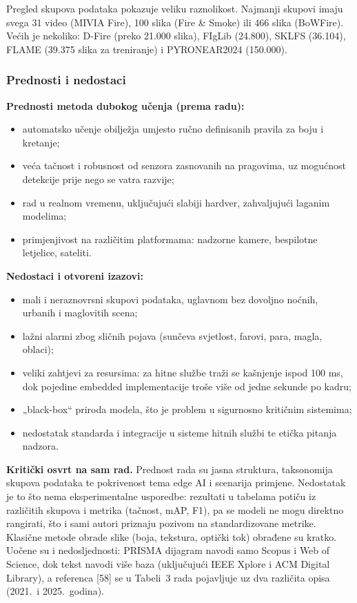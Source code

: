Pregled skupova podataka pokazuje veliku raznolikost. Najmanji skupovi imaju svega 31 video (MIVIA Fire), 100 slika (Fire \& Smoke) ili 466 slika (BoWFire). Većih je nekoliko: D-Fire (preko 21.000 slika), FIgLib (24.800), SKLFS (36.104), FLAME (39.375 slika za treniranje) i PYRONEAR2024 (150.000).

\subsubsection{Prednosti i nedostaci}
\textbf{Prednosti metoda dubokog učenja (prema radu):}
\begin{itemize}
  \item automatsko učenje obilježja umjesto ručno definisanih pravila za boju i kretanje;
  \item veća tačnost i robusnost od senzora zasnovanih na pragovima, uz mogućnost detekcije prije nego se vatra razvije;
  \item rad u realnom vremenu, uključujući slabiji hardver, zahvaljujući laganim modelima;
  \item primjenjivost na različitim platformama: nadzorne kamere, bespilotne letjelice, sateliti.
\end{itemize}

\textbf{Nedostaci i otvoreni izazovi:}
\begin{itemize}
  \item mali i neraznovrsni skupovi podataka, uglavnom bez dovoljno noćnih, urbanih i maglovitih scena;
  \item lažni alarmi zbog sličnih pojava (sunčeva svjetlost, farovi, para, magla, oblaci);
  \item veliki zahtjevi za resursima: za hitne službe traži se kašnjenje ispod 100 ms, dok pojedine embedded implementacije troše više od jedne sekunde po kadru;
  \item „black-box“ priroda modela, što je problem u sigurnosno kritičnim sistemima;
  \item nedostatak standarda i integracije u sisteme hitnih službi te etička pitanja nadzora.
\end{itemize}

\textbf{Kritički osvrt na sam rad.} Prednost rada su jasna struktura, taksonomija skupova podataka te pokrivenost tema edge AI i scenarija primjene. Nedostatak je to što nema eksperimentalne usporedbe: rezultati u tabelama potiču iz različitih skupova i metrika (tačnost, mAP, F1), pa se modeli ne mogu direktno rangirati, što i sami autori priznaju pozivom na standardizovane metrike. Klasične metode obrade slike (boja, tekstura, optički tok) obrađene su kratko. Uočene su i nedosljednosti: PRISMA dijagram navodi samo Scopus i Web of Science, dok tekst navodi više baza (uključujući IEEE Xplore i ACM Digital Library), a referenca [58] se u Tabeli~3 rada pojavljuje uz dva različita opisa (2021.\ i 2025.\ godina).

